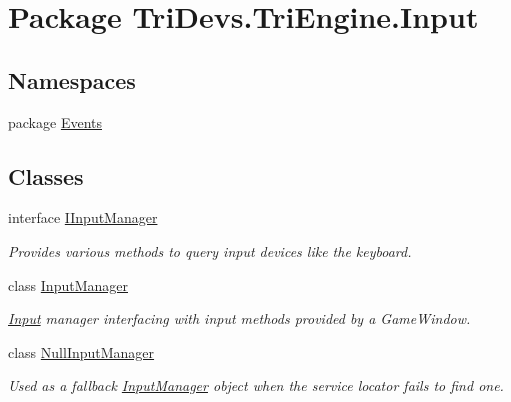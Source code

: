 \hypertarget{namespace_tri_devs_1_1_tri_engine_1_1_input}{\section{Package Tri\-Devs.\-Tri\-Engine.\-Input}
\label{namespace_tri_devs_1_1_tri_engine_1_1_input}
}
\subsection*{Namespaces}
\begin{DoxyCompactItemize}
\item 
package \hyperlink{namespace_tri_devs_1_1_tri_engine_1_1_input_1_1_events}{Events}
\end{DoxyCompactItemize}
\subsection*{Classes}
\begin{DoxyCompactItemize}
\item 
interface \hyperlink{interface_tri_devs_1_1_tri_engine_1_1_input_1_1_i_input_manager}{I\-Input\-Manager}
\begin{DoxyCompactList}\small\item\em Provides various methods to query input devices like the keyboard. \end{DoxyCompactList}\item 
class \hyperlink{class_tri_devs_1_1_tri_engine_1_1_input_1_1_input_manager}{Input\-Manager}
\begin{DoxyCompactList}\small\item\em \hyperlink{namespace_tri_devs_1_1_tri_engine_1_1_input}{Input} manager interfacing with input methods provided by a Game\-Window. \end{DoxyCompactList}\item 
class \hyperlink{class_tri_devs_1_1_tri_engine_1_1_input_1_1_null_input_manager}{Null\-Input\-Manager}
\begin{DoxyCompactList}\small\item\em Used as a fallback \hyperlink{class_tri_devs_1_1_tri_engine_1_1_input_1_1_input_manager}{Input\-Manager} object when the service locator fails to find one. \end{DoxyCompactList}\end{DoxyCompactItemize}
